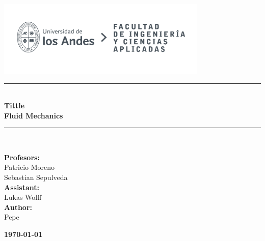 \documentclass{article} %
\begin{document}
\begin{titlepage}%
\newcommand{\HRule}{\rule{\linewidth}{0.5mm}} 
\center 
\includegraphics[width=10cm]{LOGO_UNIVERSIDAD.jpg}\\ %
\vspace{3cm}
\HRule \\[0.4cm]
{ \huge \bfseries Tittle}\\[0.4cm] %
{ \huge \bfseries Fluid Mechanics}\\[0.4cm] %
\HRule \\[1.5cm]
 \vspace{5cm}
\begin{flushright}
    { \textbf{Profesors:}\\
    Patricio Moreno\\
    Sebastian Sepulveda\\
    \vspace{0.2cm}
    \textbf{Assistant:}\\
    Lukas Wolff\\
    \vspace{0.2cm}
    \textbf{Author:}\\
    Pepe\\
}
\end{flushright}
\vspace{1cm}
{\large \textbf{\today}}\\[2cm] %
\end{titlepage}
\end{document}
